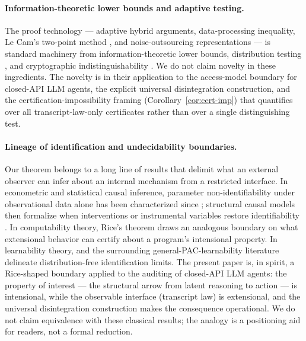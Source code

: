 \documentclass{article}
\theoremstyle{plain}
\theoremstyle{definition}
\theoremstyle{remark}
\begin{document}
\paragraph{Information-theoretic lower bounds and adaptive testing.}
The proof technology --- adaptive hybrid arguments, data-processing
inequality, Le Cam's two-point method \citep{lecam1986,tsybakov2009,
coverthomas2006}, and noise-outsourcing representations
\citep{kallenberg2021} --- is standard machinery from
information-theoretic lower bounds, distribution testing
\citep{canonne2020survey}, and cryptographic indistinguishability
\citep{goldreich2001foundations}. We do not claim novelty in these
ingredients. The novelty is in their application to the access-model
boundary for closed-API LLM agents, the explicit universal disintegration
construction, and the certification-impossibility framing
(Corollary~\ref{cor:cert-imp}) that quantifies over all transcript-law-only
certificates rather than over a single distinguishing test.

\paragraph{Lineage of identification and undecidability boundaries.}
Our theorem belongs to a long line of results that delimit what an
external observer can infer about an internal mechanism from a restricted
interface. In econometric and statistical causal inference, parameter
non-identifiability under observational data alone has been characterized
since \citet{koopmans1949identification}; structural causal models then
formalize when interventions or instrumental variables restore
identifiability \citep{pearl2009,bareinboim2016causal}. In computability
theory, Rice's theorem \citep{rice1953classes} draws an analogous boundary
on what extensional behavior can certify about a program's intensional
property. In learnability theory, \citet{shalevshwartz2010learnability}
and the surrounding general-PAC-learnability literature delineate
distribution-free identification limits. The present paper is, in spirit,
a Rice-shaped boundary applied to the auditing of closed-API LLM agents:
the property of interest --- the structural arrow from latent reasoning
to action --- is intensional, while the observable interface (transcript
law) is extensional, and the universal disintegration construction makes
the consequence operational. We do not claim equivalence with these
classical results; the analogy is a positioning aid for readers, not a
formal reduction.
\end{document}
